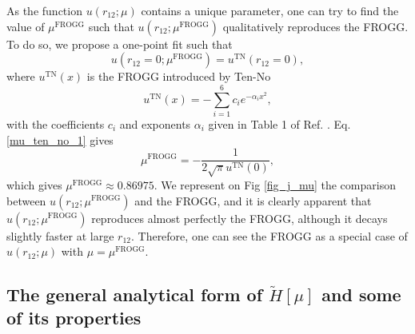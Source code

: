 \documentclass[aip,jcp,reprint,noshowkeys,superscriptaddress]{revtex4-1}
\newcommand{\mfrogg}[0]{\mu^\text{FROGG}}
\begin{document}
As the function $u(r_{12};\mu)$ contains a unique parameter, one can try to find the value of $\mfrogg$ such that 
$u(r_{12};\mfrogg)$ qualitatively reproduces the FROGG. 
To do so, we propose a one-point fit such that 
\begin{equation}
 \label{mu_ten_no_1}
u(r_{12}=0;\mfrogg) = u^{\text{TN}}(r_{12}=0), 
\end{equation}
where $ u^{\text{TN}}(x)$ is the FROGG introduced by Ten-No
\begin{equation}
 \label{eq_frogg}
 u^{\text{TN}}(x) = -\sum_{i=1}^6 c_i e^{-\alpha_i x^2 },
\end{equation}
with the coefficients $c_i$ and exponents $\alpha_i$ given in Table 1 of Ref. . 
Eq. \eqref{mu_ten_no_1} gives 
\begin{equation}
 \label{mu_ten_no_2}
 \mfrogg = -\frac{1}{2\sqrt{\pi}u^{\text{TN}}(0)},
\end{equation}
which gives $\mfrogg\approx0.86975$. 
We represent on Fig \ref{fig_j_mu} the comparison between $u(r_{12};\mfrogg)$ and the FROGG, and it is clearly apparent  that $u(r_{12};\mfrogg)$ reproduces almost perfectly the FROGG, although it decays slightly faster at large $r_{12}$. Therefore, one can see the FROGG as a special case of $u(r_{12};\mu)$  with $\mu = \mfrogg$. 

\subsection{The general analytical form of  $\tilde{H}[\mu]$ and some of its properties}
\label{sec:ht_general}
\end{document}
